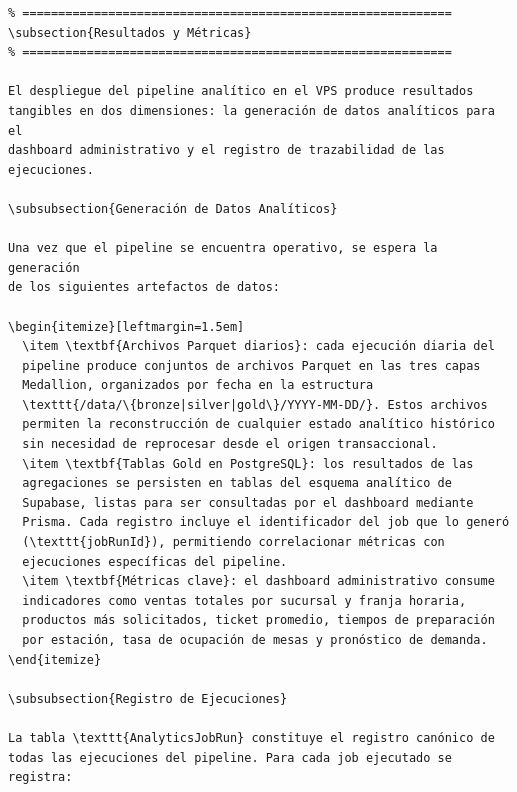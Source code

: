 \begin{verbatim}
% ============================================================
\subsection{Resultados y Métricas}
% ============================================================

El despliegue del pipeline analítico en el VPS produce resultados
tangibles en dos dimensiones: la generación de datos analíticos para el
dashboard administrativo y el registro de trazabilidad de las
ejecuciones.

\subsubsection{Generación de Datos Analíticos}

Una vez que el pipeline se encuentra operativo, se espera la generación
de los siguientes artefactos de datos:

\begin{itemize}[leftmargin=1.5em]
  \item \textbf{Archivos Parquet diarios}: cada ejecución diaria del
  pipeline produce conjuntos de archivos Parquet en las tres capas
  Medallion, organizados por fecha en la estructura
  \texttt{/data/\{bronze|silver|gold\}/YYYY-MM-DD/}. Estos archivos
  permiten la reconstrucción de cualquier estado analítico histórico
  sin necesidad de reprocesar desde el origen transaccional.
  \item \textbf{Tablas Gold en PostgreSQL}: los resultados de las
  agregaciones se persisten en tablas del esquema analítico de
  Supabase, listas para ser consultadas por el dashboard mediante
  Prisma. Cada registro incluye el identificador del job que lo generó
  (\texttt{jobRunId}), permitiendo correlacionar métricas con
  ejecuciones específicas del pipeline.
  \item \textbf{Métricas clave}: el dashboard administrativo consume
  indicadores como ventas totales por sucursal y franja horaria,
  productos más solicitados, ticket promedio, tiempos de preparación
  por estación, tasa de ocupación de mesas y pronóstico de demanda.
\end{itemize}

\subsubsection{Registro de Ejecuciones}

La tabla \texttt{AnalyticsJobRun} constituye el registro canónico de
todas las ejecuciones del pipeline. Para cada job ejecutado se registra:


\end{verbatim}
